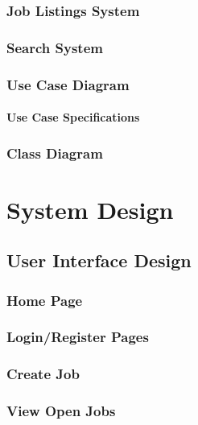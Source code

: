 \subsection{Job Listings System}

\subsection{Search System}

\subsection{Use Case Diagram}

\subsubsection{Use Case Specifications}

\subsection{Class Diagram}







\chapter{System Design}

\section{User Interface Design}


\subsection{Home Page}

\subsection{Login/Register Pages}

\subsection{Create Job}

\subsection{View Open Jobs}

